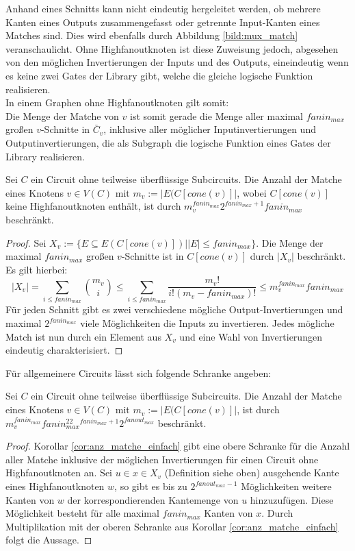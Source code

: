 \documentclass[11pt, a4paper, german]{article}
\begin{document}
Anhand eines Schnitts kann nicht eindeutig hergeleitet werden, ob mehrere Kanten eines Outputs zusammengefasst oder getrennte Input-Kanten eines Matches sind. Dies wird ebenfalls durch Abbildung \ref{bild:mux_match} veranschaulicht. Ohne Highfanoutknoten ist diese Zuweisung jedoch, abgesehen von den möglichen Invertierungen der Inputs und des Outputs, eineindeutig wenn es keine zwei Gates der Library gibt, welche die gleiche  logische Funktion realisieren.\\
In einem Graphen ohne Highfanoutknoten gilt somit: \\
Die Menge der Matche von $v$ ist somit gerade die Menge aller maximal $fanin_{max}$ großen $v$-Schnitte in $\bar{C}_v$, inklusive aller möglicher Inputinvertierungen und Outputinvertierungen, die als Subgraph die logische Funktion eines Gates der Library realisieren.
\begin{cor}\label{cor:anz_matche_einfach}
Sei $C$ ein Circuit ohne teilweise überflüssige Subcircuits. Die Anzahl der Matche eines Knotens $v\in V(C)$ mit $m_v := |E(C[cone(v)]|$, wobei $C[cone(v)]$ keine Highfanoutknoten enthält, ist durch $m_v^{fanin_{max}} 2^{fanin_{max}+1} fanin_{max}$ beschränkt.
\end{cor}
\begin{proof}
Sei  $X_v:= \{ E \subseteq E(C[cone(v)]) | |E|\leq fanin_{max}  \}$. Die Menge der maximal $fanin_{max}$ großen $v$-Schnitte ist in $C[cone(v)]$ durch $ |X_v|$ beschränkt. Es gilt hierbei:
\[ |X_v| = \sum\limits_{i \leq fanin_{max}} \binom{m_v}{i} \leq  \sum\limits_{i \leq fanin_{max}}\frac{m_v!}{i!(m_v-fanin_{max})!} \leq m_v^{fanin_{max}} fanin_{max} \]
Für jeden Schnitt gibt es zwei verschiedene mögliche Output-Invertierungen und maximal  $2^{fanin_{max}}$ viele Möglichkeiten die Inputs zu invertieren. Jedes mögliche Match ist nun durch ein Element aus $X_v$ und eine Wahl von Invertierungen eindeutig charakterisiert.
\end{proof}
Für allgemeinere Circuits lässt sich folgende Schranke angeben: 
\begin{cor}\label{cor:anzahl_matche_bel}
Sei $C$ ein Circuit ohne teilweise überflüssige Subcircuits. Die Anzahl der Matche eines Knotens $v\in V(C)$ mit $m_v := |E(C[cone(v)]|$, ist durch \\ $m_v^{fanin_{max}} fanin_{max}^22^{fanin_{max}+1}2^{fanout_{max}}$ beschränkt.
\end{cor}
\begin{proof}
Korollar \ref{cor:anz_matche_einfach} gibt eine obere Schranke für die Anzahl aller Matche inklusive der möglichen Invertierungen für einen Circuit ohne Highfanoutknoten an. Sei $u \in x \in X_v$ (Definition siehe oben) ausgehende Kante eines Highfanoutknoten $w$, so gibt es bis zu $2^{fanout_{max}-1}$ Möglichkeiten weitere Kanten von $w$ der korrespondierenden Kantemenge von $u$ hinzuzufügen.  Diese Möglichkeit besteht für alle maximal $fanin_{max}$ Kanten von $x$. Durch Multiplikation mit der oberen Schranke aus Korollar \ref{cor:anz_matche_einfach} folgt die Aussage.
\end{proof}
\end{document}
